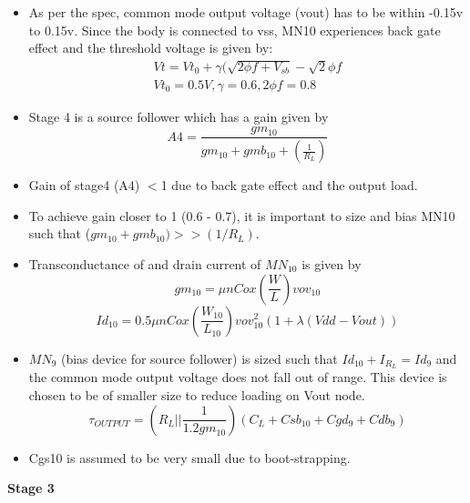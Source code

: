 \documentclass[12pt,a4paper]{article}
\begin{document}
\begin{itemize}
	\item As per the spec, common mode output voltage (vout) has to be within -0.15v to 0.15v. Since the body is connected to vss, MN10 experiences back gate effect and the threshold voltage is given by:
	\begin{equation}
	\begin{split}
		Vt=Vt_0+ \gamma(\sqrt{2\phi f+V_{sb}}- \sqrt{2}\phi f\\
		Vt_0=0.5V , \gamma=0.6 , 2\phi f=0.8
	\end{split}
	\end{equation}


	\item Stage 4 is a source follower which has a gain given by
	\begin{equation}
		A4=\frac{gm_{10}}{gm_{10}+gmb_{10}+(\frac{1}{R_L})}
	\end{equation}
	\item Gain of stage4 (A4) $<$1 due to back gate effect and the output load. 
	\item To achieve gain closer to 1 (0.6 - 0.7), it is important to size and bias MN10 such that ($gm_{10}+ gmb_{10}) >> (1/R_L)$. 
	\item Transconductance of and drain current of $MN_{10}$ is given by 
	\begin{equation}
		gm_{10}= \mu nCox(\frac{W}{L})vov_{10}
	\end{equation}
	\begin{equation}
		Id_{10}=0.5\mu nCox(\frac{W_{10}}{L_{10}})vov_{10}^2 (1+\lambda (Vdd-Vout))
	\end{equation}
	\item $MN_9$ (bias device for source follower) is sized such that $Id_{10}+ I_{R_L}= Id_9$ and the common mode output voltage does not fall out of range. This device is chosen to be of smaller size to reduce loading on Vout node. 
	\begin{equation}
		\tau_{OUTPUT} = (R_L || \frac{1}{1.2gm_{10}})(C_L+Csb_{10}+Cgd_9+Cdb_9)
	\end{equation}
	\item Cgs10 is assumed to be very small due to boot-strapping.
\end{itemize}


\textbf{Stage 3}
\end{document}
